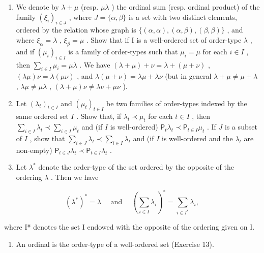 \begin{enumerate}
\def\labelenumi{(\alph{enumi})}
\setcounter{enumi}{4}
\item
  We denote by \(\lambda + \mu\) (resp. \(\mu\lambda\) ) the ordinal sum (resp. ordinal product) of the family \((\xi_{i})_{i \in J}\) , where \(J = \{\alpha, \beta\}\) is a set with two distinct elements, ordered by the relation whose graph is \(\{(\alpha, \alpha), (\alpha, \beta), (\beta, \beta)\}\) , and where \(\xi_{\alpha} = \lambda\) , \(\xi_{\beta} = \mu\) . Show that if I is a well-ordered set of order-type \(\lambda\) , and if \((\mu_{i})_{i \in I}\) is a family of order-types such that \(\mu_{i} = \mu\) for each \(i \in I\) , then \(\sum_{i \in I} \mu_{i} = \mu\lambda\) . We have \((\lambda + \mu) + \nu = \lambda + (\mu + \nu)\) , \((\lambda\mu)\nu = \lambda(\mu\nu)\) , and \(\lambda(\mu + \nu) = \lambda\mu + \lambda\nu\) (but in general \(\lambda + \mu \neq \mu + \lambda\) , \(\lambda\mu \neq \mu\lambda\) , \((\lambda + \mu)\nu \neq \lambda\nu + \mu\nu\) ).
\item
  Let \((\lambda_{t})_{t\in I}\) and \((\mu_{t})_{t\in I}\) be two families of order-types indexed by the same ordered set \(I\) . Show that, if \(\lambda_{t} \prec \mu_{t}\) for each \(t \in I\) , then \(\sum_{i \in I} \lambda_{t} \prec \sum_{i \in I} \mu_{t}\) and (if \(I\) is well-ordered) \(\mathsf{P}_{t} \lambda_{t} \prec \mathsf{P}_{t \in I} \mu_{t}\) . If \(J\) is a subset of \(I\) , show that \(\sum_{i \in J} \lambda_{t} \prec \sum_{i \in I} \lambda_{t}\) and (if \(I\) is well-ordered and the \(\lambda_{t}\) are non-empty) \(\mathsf{P}_{t \in J} \lambda_{t} \prec \mathsf{P}_{t \in I} \lambda_{t}\) .
\item
  Let \(\lambda^{*}\) denote the order-type of the set ordered by the opposite of the ordering \(\lambda\) . Then we have
\end{enumerate}

\[
(\lambda^ {*}) ^ {*} = \lambda \quad \text { and } \quad \left(\sum_ {i \in I} \lambda_ {i}\right) ^ {*} = \sum_ {i \in I ^ {*}} \lambda_ {i},
\]

where I* denotes the set I endowed with the opposite of the ordering given on I.

\begin{enumerate}
\def\labelenumi{\arabic{enumi}.}
\setcounter{enumi}{13}
\tightlist
\item
  An ordinal is the order-type of a well-ordered set (Exercise 13).
\end{enumerate}


